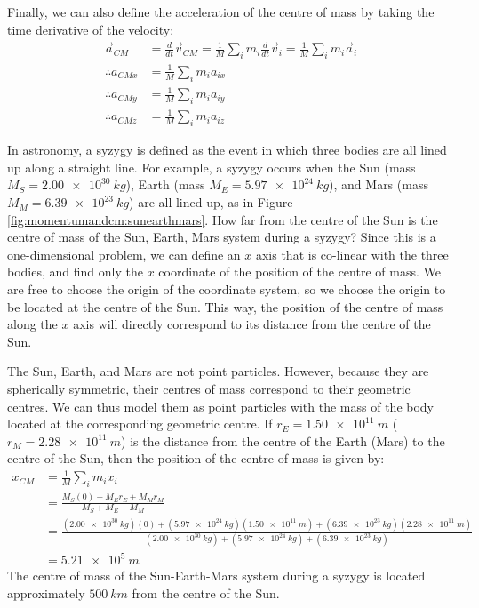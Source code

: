 Finally, we can also define the acceleration of the centre of mass by taking the time derivative of the velocity:
\begin{align}
\vec a_{CM} &= \frac{d}{dt}\vec v_{CM} = \frac{1}{M}\sum_i m_i\frac{d}{dt}\vec v_i=  \frac{1}{M}\sum_i m_i\vec a_i\nonumber\\
\therefore a_{CMx} &= \frac{1}{M}\sum_i m_i a_{ix}\nonumber\\
\therefore a_{CMy} &= \frac{1}{M}\sum_i m_i a_{iy}\nonumber\\
\therefore a_{CMz} &= \frac{1}{M}\sum_i m_i a_{iz}
\end{align}

\begin{example}{
In astronomy, a syzygy is defined as the event in which three bodies are all lined up along a straight line. For example, a syzygy occurs when the Sun (mass $M_S=\SI{2.00e30}{kg}$), Earth (mass $M_E=\SI{5.97e24}{kg}$), and Mars (mass $M_M=\SI{6.39e23}{kg}$) are all lined up, as in Figure \ref{fig:momentumandcm:sunearthmars}. How far from the centre of the Sun is the centre of mass of the Sun, Earth, Mars system during a syzygy?}
Since this is a one-dimensional problem, we can define an $x$ axis that is co-linear with the three bodies, and find only the $x$ coordinate of the position of the centre of mass. We are free to choose the origin of the coordinate system, so we choose the origin to be located at the centre of the Sun. This way, the position of the centre of mass along the $x$ axis will directly correspond to its distance from the centre of the Sun.

The Sun, Earth, and Mars are not point particles. However, because they are spherically symmetric, their centres of mass correspond to their geometric centres. We can thus model them as point particles with the mass of the body located at the corresponding geometric centre. If $r_E=\SI{1.50e11}{m}$ ($r_M=\SI{2.28e11}{m}$) is the distance from the centre of the Earth (Mars) to the centre of the Sun, then the position of the centre of mass is given by:
\begin{align*}
x_{CM} &= \frac{1}{M}\sum_i m_i x_i\\
&=\frac{M_S(0)+M_Er_E+M_Mr_M}{M_S+M_E+M_M}\\
&=\frac{(\SI{2.00e30}{kg})(0)+(\SI{5.97e24}{kg})(\SI{1.50e11}{m})+(\SI{6.39e23}{kg})(\SI{2.28e11}{m})}{(\SI{2.00e30}{kg})+(\SI{5.97e24}{kg})+(\SI{6.39e23}{kg})}\\
&=\SI{5.21e5}{m}
\end{align*}
The centre of mass of the Sun-Earth-Mars system during a syzygy is located approximately $\SI{500}{km}$ from the centre of the Sun.


\end{example}
